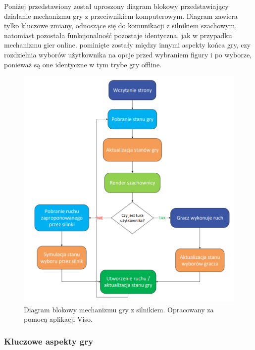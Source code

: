 \documentclass[12pt,a4paper]{article}
\begin{document}
\newpage

\noindent
Poniżej przedstawiony został uproszony diagram blokowy przedstawiający działanie mechanizmu gry z przeciwnikiem komputerowym. Diagram zawiera tylko kluczowe zmiany, odnoszące się do komunikacji z silnikiem szachowym, natomiast pozostała funkcjonalność pozostaje identyczna, jak w przypadku mechanizmu gier online. pominięte zostały między innymi aspekty końca gry, czy rozdzielnia wyborów użytkownika na opcje przed wybraniem figury i po wyborze, ponieważ są one identyczne w tym trybe gry offline.

\vspace{1cm}
\begin{figure}[h!]
    \centering
    \includegraphics[width=1\textwidth]{images/diagram_enggry.png}
    \caption{Diagram blokowy mechanizmu gry z silnikiem. Opracowany za pomocą aplikacji Viso.}
\end{figure}

\newpage

\subsubsection{Kluczowe aspekty gry}
\end{document}
